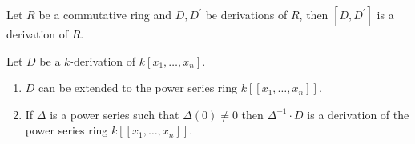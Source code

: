 \documentclass[12pt, oneside]{book}
\begin{document}
\begin{proposition}
    Let $R$ be a commutative ring and $D, D^{\prime}$ be derivations of $R$, then $\left[D, D^{\prime}\right]$ is a derivation of $R$.


\end{proposition}
\begin{proposition}
    Let $D$ be a $k$-derivation of $k\left[x_1, \ldots, x_n\right]$.
    \begin{enumerate}
        \item
              $D$ can be extended to the power series ring $k\left[\left[x_1, \ldots, x_n\right]\right]$.
        \item
              If $\Delta$ is a power series such that $\Delta(0) \neq 0$ then $\Delta^{-1} \cdot D$ is a derivation of the power series ring $k\left[\left[x_1, \ldots, x_n\right]\right]$.
    \end{enumerate}
\end{proposition}
\end{document}
